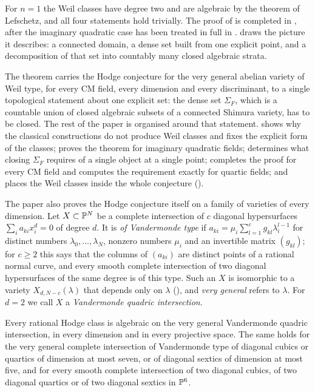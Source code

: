 For $n=1$ the Weil classes have degree two and are algebraic by the theorem
of Lefschetz, and all four statements hold trivially. The proof of
 is completed in , after the imaginary
quadratic case has been treated in full in .
 draws the picture it describes: a connected domain, a
dense set built from one explicit point, and a decomposition of that set into
countably many closed algebraic strata.

The theorem carries the Hodge conjecture for the very general abelian variety
of Weil type, for every CM field, every dimension and every discriminant, to
a single topological statement about one explicit set: the dense set
$\Sigma_{F}$, which is a countable union of closed algebraic subsets of a
connected Shimura variety, has to be closed. The rest of the paper is
organised around that statement.  shows why the
classical constructions do not produce Weil classes and fixes the explicit
form of the classes;  proves the theorem for imaginary
quadratic fields;  determines what closing
$\Sigma_{F}$ requires of a single object at a single point;
 completes the proof for every CM field and computes the
requirement exactly for quartic fields; and  places the
Weil classes inside the whole conjecture ().

The paper also proves the Hodge conjecture itself on a family of varieties
of every dimension. Let $X\subset\mathbb{P}^{N}$ be a complete intersection of $c$
diagonal hypersurfaces $\sum_{i}a_{ki}x_{i}^{d}=0$ of degree $d$. It is
\emph{of Vandermonde type} if $a_{ki}=\mu_{i}\sum_{l=1}^{c}g_{kl}\lambda_{i}^{l-1}$
for distinct numbers $\lambda_{0},\dots,\lambda_{N}$, nonzero numbers
$\mu_{i}$ and an invertible matrix $(g_{kl})$; for $c\ge2$ this says that the
columns of $(a_{ki})$ are distinct points of a rational normal curve, and
every smooth complete intersection of two diagonal hypersurfaces of the same
degree is of this type. Such an $X$ is isomorphic to a variety
$X_{d,N-c}(\lambda)$ that depends only on $\lambda$ (),
and \emph{very general} refers to $\lambda$. For $d=2$ we call $X$ a
\emph{Vandermonde quadric intersection}.

\begin{theorem}\label{thm:introvandermonde}
Every rational Hodge class is algebraic on the very general Vandermonde
quadric intersection, in every dimension and in every projective space. The
same holds for the very general complete intersection of Vandermonde type of
diagonal cubics or quartics of dimension at most seven, or of diagonal
sextics of dimension at most five, and for every smooth complete
intersection of two diagonal cubics, of two diagonal quartics or of two
diagonal sextics in $\mathbb{P}^{6}$.
\end{theorem}

